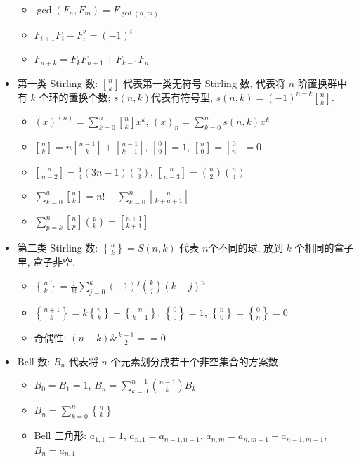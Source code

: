 \documentclass[landscape,a4paper]{article}
\newcommand{\stlf}[2]{\genfrac{ [ }{ ] }{0pt}{}{#1}{#2}}
\newcommand{\stls}[2]{\genfrac{ \{ }{ \} }{0pt}{}{#1}{#2}}
\begin{document}
\begin{spacing}{0.3}
\begin{multicols}{2}
\begin{itemize}
\begin{itemize}
  \item $\gcd(F_n,F_m)=F_{\gcd(n,m)}$
  \item $F_{i + 1} F_i - F_i^2 = (-1) ^ i$
  \item $F_{n + k} = F_k F_{n + 1} + F_{k - 1} F_n$
  \end{itemize}
\item 第一类 Stirling 数: $\stlf{n}{k}$ 代表第一类无符号 Stirling 数, 代表将 $n$ 阶置换群中有 $k$ 个环的置换个数; $s(n,k)$代表有符号型, $s(n, k) = (-1)^{n - k}\stlf{n}{k}$.
  \begin{itemize}
  \item $(x)^{(n)} = \sum\limits_{k = 0}^{n}\stlf{n}{k}x ^k$, $(x)_{n} = \sum\limits_{k = 0}^{n} s(n, k) x ^k$
  \item $\stlf{n}{k} = n\stlf{n - 1}{k} + \stlf{n - 1}{k - 1}$, $\stlf{0}{0} = 1$, $\stlf{n}{0} = \stlf{0}{n} = 0$
  \item $\stlf{n}{n - 2} = \frac{1}{4} (3n - 1) \binom{n}{3} $, $\stlf{n}{n - 3} = \binom{n}{2} \binom{n}{4} $
  \item $\sum\limits_{k = 0}^{a}\stlf{n}{k} = n! - \sum\limits_{k = 0}^{n} \stlf{n}{k + a + 1}$
  \item $\sum\limits_{p = k}^{n}\stlf{n}{p}\binom{p}{k} = \stlf{n + 1}{k + 1}$
  \end{itemize}
\item 第二类 Stirling 数: $\stls{n}{k} = S(n, k)$ 代表 $n$个不同的球, 放到 $k$ 个相同的盒子里, 盒子非空.
  \begin{itemize}
  \item $\stls{n}{k} = \frac{1}{k!} \sum\limits_{j = 0}^{k} (-1)^j \binom{k}{j} (k - j)^n$
  \item $\stls{n + 1}{k} = k\stls{n}{k} + \stls{n}{k - 1}$, $\stls{0}{0} = 1$, $\stls{n}{0} = \stls{0}{n} = 0$
  \item 奇偶性: $(n - k) \& \frac{k - 1}{2} == 0$
  \end{itemize}
\item Bell 数: $B_n$ 代表将 $n$ 个元素划分成若干个非空集合的方案数
  \begin{itemize}
  \item $B_0 = B_1 = 1$, $B_n = \sum\limits_{k = 0}^{n - 1} \binom{n - 1}{k} B_k$
  \item $B_n = \sum\limits_{k = 0}^{n} \stls{n}{k} $
  \item Bell 三角形: $a_{1, 1} = 1$, $a_{n, 1} = a_{n - 1, n - 1}$, $a_{n, m} = a_{n, m - 1} + a_{n - 1, m - 1}$, $B_n = a_{n, 1}$

\end{itemize}
\end{itemize}
\end{multicols}
\end{spacing}
\end{document}
